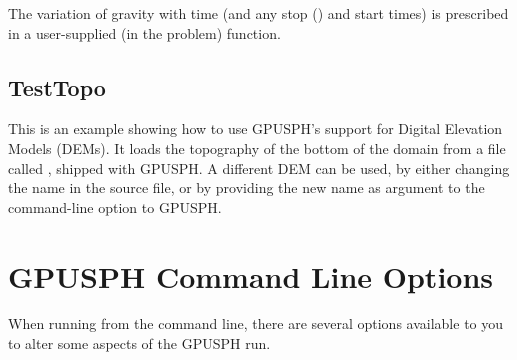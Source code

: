 \iffalse
\begin{figure}[h]
\centering{%
\texttt{[image: Seiche.png]}%
}
\caption{Resonant seiching in a rectangular domain showing the results
of a time varying gravity in the problem, \cmd{Seiche.cc}. Here the tank has
been shaking side to side at the resonant frequency of $0.638$s. The
color coding is for the pressure in the fluid.}
\end{figure}
\else
\fi

The variation of gravity with time (and any stop () and
start times) is prescribed in a user-supplied (in the problem)
 function.

\subsection{TestTopo}

This is an example showing how to use GPUSPH's support for Digital
Elevation Models (DEMs). It loads the topography of the bottom of the
domain from a file called , shipped with GPUSPH.
A different DEM can be used, by either changing the name in the source
 file, or by providing the new name as argument to the
 command-line option to GPUSPH.


\section{GPUSPH Command Line Options}\label{options}

When running from the command line, there are several options available
to you to alter some aspects of the GPUSPH run.

